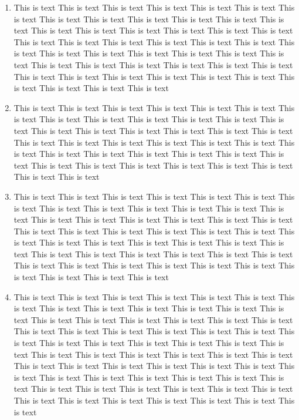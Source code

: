 \documentclass[a4paper]{uestcreport}
\begin{document}
\begin{enumerate}
    \item This is text This is text This is text This is text This is text This is text This is text This is text This is text This is text This is text This is text This is text This is text This is text This is text This is text This is text This is text This is text This is text This is text This is text This is text This is text This is text This is text This is text This is text This is text This is text This is text This is text This is text This is text This is text This is text This is text This is text This is text This is text This is text This is text This is text This is text This is text This is text This is text 
    \item This is text This is text This is text This is text This is text This is text This is text This is text This is text This is text This is text This is text This is text This is text This is text This is text This is text This is text This is text This is text This is text This is text This is text This is text This is text This is text This is text This is text This is text This is text This is text This is text This is text This is text This is text This is text This is text This is text This is text This is text 
    \item This is text This is text This is text This is text This is text This is text This is text This is text This is text This is text This is text This is text This is text This is text This is text This is text This is text This is text This is text This is text This is text This is text This is text This is text This is text This is text This is text This is text This is text This is text This is text This is text This is text This is text This is text This is text This is text This is text This is text This is text This is text This is text This is text This is text This is text This is text This is text This is text 
    \item This is text This is text This is text This is text This is text This is text This is text This is text This is text This is text This is text This is text This is text This is text This is text This is text This is text This is text This is text This is text This is text This is text This is text This is text This is text This is text This is text This is text This is text This is text This is text This is text This is text This is text This is text This is text This is text This is text This is text This is text This is text This is text This is text This is text This is text This is text This is text This is text This is text This is text This is text This is text This is text This is text This is text This is text This is text This is text This is text This is text This is text This is text This is text This is text 

\end{enumerate}
\end{document}
